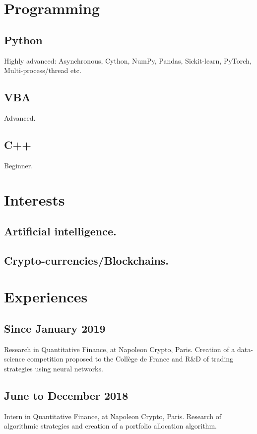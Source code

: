 \documentclass[a4paper,11pt]{arthur-cv}
\begin{document}
\begin{textblock}{20.5}
\begin{minipage}[t]{0.38\textwidth}
    \section{Programming}
      \subsection{Python}{Highly advanced: Asynchronous, Cython, NumPy, Pandas, Sickit-learn, PyTorch, Multi-process/thread etc.}
      \subsection{VBA}{Advanced.}
      \subsection{C++}{Beginner.}

    \section{Interests}
      \subsection{Artificial intelligence.}
      \subsection{Crypto-currencies/Blockchains.}

  \end{minipage}
  \begin{minipage}[t]{0.62\textwidth}
  
    \section{Experiences}
      \subsection{Since January 2019}{Research in Quantitative Finance, at Napoleon Crypto, Paris. Creation of a data-science competition proposed to the Collège de France and  R\&D of trading strategies using neural networks.}
      \subsection{June to December 2018}{Intern in Quantitative Finance, at Napoleon Crypto, Paris. Research of algorithmic strategies and creation of a portfolio allocation algorithm.}

\end{minipage}
\end{textblock}
\end{document}

